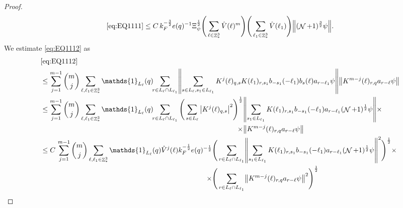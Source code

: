 \documentclass[sn-mathphys, Numbered ,a4paper]{sn-jnl}%
\DeclareMathOperator{\Z}{\mathbb{Z}}
\DeclareMathOperator{\NN}{\mathcal{N}}
\newcommand{\half}{\frac{1}{2}}
\theoremstyle{plain}
\theoremstyle{definition}
\theoremstyle{remark}
\theoremstyle{plain}
\theoremstyle{definition}
\theoremstyle{remark}
\begin{document}
\begin{proof}
\begin{comment}\begin{equation}
    \eqref{eq:EQ1111}\leq C\, \Xi^\half \Bigg(\sum\limits_{\ell \in \Z^3_*} \norm{K^m(\ell)}_{\mathrm{max}}\Bigg)\Bigg( \sum\limits_{\ell_1 \in \Z^3_*}\norm{K(\ell_1)}_{\mathrm{max,2}} \Bigg)  \norm { (\NN+1)^{\frac{3}{2}} \psi }.    
\end{equation}
Then we use to get\end{comment}
\begin{equation}
	 \eqref{eq:EQ1111}\leq C\, {k_{F}^{-\frac{3}{2}} }{e(q)^{-1}} \Xi_{\psi}^\half \Bigg(\sum\limits_{\ell \in \Z^3_*} \hat{V}(\ell)^m\Bigg)\Bigg( \sum\limits_{\ell_1 \in \Z^3_*} \hat{V}(\ell_1) \Bigg) \norm { (\NN+1)^{\frac{3}{2}} \psi }. \label{eq:estEQ1111} 
\end{equation}
We estimate \eqref{eq:EQ1112} as 
\begin{alignat}{2}
	&\eqref{eq:EQ1112}\nonumber\\
	&\leq \sum\limits_{j=1}^{m-1} {{m}\choose j} \sum\limits_{\ell, \ell_1\in \Z^3_*} \mathds{1}_{L_{\ell}}(q)\!\! \sum\limits_{r\in L_{\ell} \cap L_{\ell_1}}\! \norm{ \sum\limits_{s \in L_\ell, s_1 \in L_{\ell_1}} K^{j}(\ell)_{q,s} K(\ell_1)_{r,s_1} b_{-s_1}(-\ell_1) b_{s}(\ell) a_{r-\ell_1}\psi}\norm{  K^{m-j}(\ell)_{r,q} a_{r-\ell} \psi } \nonumber\\
	&\leq \sum\limits_{j=1}^{m-1} {{m}\choose j} \sum\limits_{\ell, \ell_1\in \Z^3_*} \mathds{1}_{L_{\ell}}(q)\!\! \sum\limits_{r\in L_{\ell} \cap L_{\ell_1}}\! \begin{aligned}[t]\Bigg( \sum\limits_{s \in L_\ell}\abs{K^{j}(\ell)_{q,s}}^2\Bigg)^\half &\norm{ \sum\limits_{ s_1 \in L_{\ell_1}}  K(\ell_1)_{r,s_1} b_{-s_1}(-\ell_1)  a_{r-\ell_1}(\NN+1)^\half\psi}\times \nonumber\\ \times&\norm{  K^{m-j}(\ell)_{r,q} a_{r-\ell} \psi } \end{aligned} \nonumber\\
	&\leq C\,\sum\limits_{j=1}^{m-1} {{m}\choose j} \sum\limits_{\ell, \ell_1\in \Z^3_*} \begin{aligned}[t] \mathds{1}_{L_{\ell}}(q) \hat{V}^j(\ell) k_F^{-\half} e(q)^{-\half} &\Bigg( \sum\limits_{r\in L_{\ell} \cap L_{\ell_1}}\! \norm{ \sum\limits_{ s_1 \in L_{\ell_1}}  K(\ell_1)_{r,s_1} b_{-s_1}(-\ell_1)  a_{r-\ell_1}(\NN+1)^\half\psi} ^2\Bigg)^\half \times\nonumber\\ \quad\times&\Bigg( \sum\limits_{r\in L_{\ell} \cap L_{\ell_1}}\!\norm{  K^{m-j}(\ell)_{r,q} a_{r-\ell} \psi }^2\Bigg)^\half \end{aligned}\nonumber\\

\end{alignat}
\end{proof}
\end{document}
